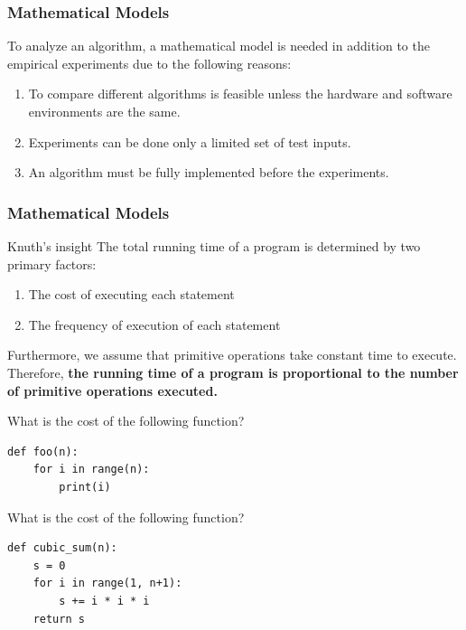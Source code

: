 \documentclass[aspectratio=169, 14pt]{beamer}
\begin{document}
\begin{frame}[fragile]
	\frametitle{Mathematical Models}
	To analyze an algorithm, a \alert{mathematical model} is needed in addition to the empirical experiments due to the following reasons:
	\begin{enumerate}
		\item<1-> To compare different algorithms is feasible unless the hardware and software environments are the same.
		\item<2-> Experiments can be done only a limited set of test inputs.
		\item<3-> An algorithm must be fully implemented before the experiments.
	\end{enumerate}
\end{frame}

\begin{frame}
	\frametitle{Mathematical Models}

	\begin{exampleblock}{Knuth's insight}
		The total running time of a program is determined by two primary factors:
		\begin{enumerate}
			\item The cost of executing each statement
			\item The frequency of execution of each statement
		\end{enumerate}
	\end{exampleblock}

	Furthermore, we assume that \alert{primitive operations} take \alert{constant} time to execute. Therefore, \textbf{the running time of a program is proportional to the number of primitive operations executed.}

\end{frame}

\begin{frame}[fragile]

	{\large {}} What is the cost of the following function?
	\begin{verbatim}
def foo(n):
    for i in range(n):
        print(i)
\end{verbatim}

	{\large {}} What is the cost of the following function?
	\begin{verbatim}
def cubic_sum(n):
    s = 0
    for i in range(1, n+1):
        s += i * i * i
    return s
\end{verbatim}
\end{frame}
\end{document}

